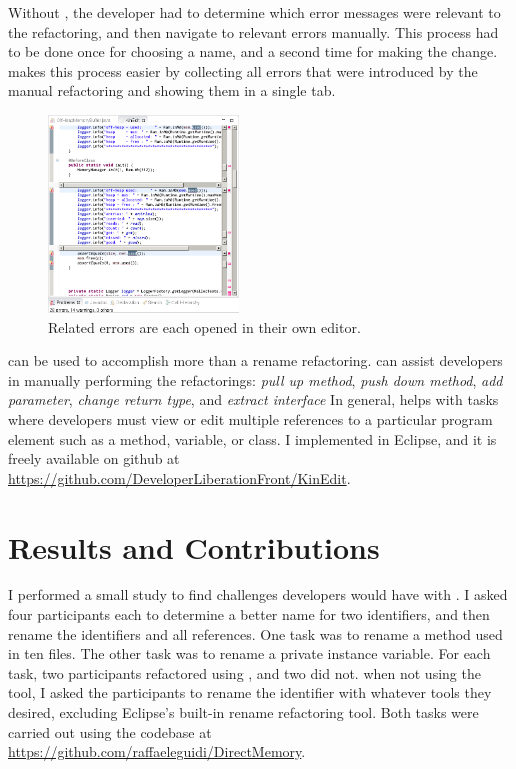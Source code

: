 \documentclass{sigplanconf}
\begin{document}
Without \pname{}, the developer had to determine which error messages were
relevant to the refactoring, and then navigate to relevant errors manually. This
process had to be done once for choosing a name, and a second time for making
the change. \pname{} makes this process easier by collecting all errors that
were introduced by the manual refactoring and showing them in a single tab.

\begin{figure}[h]
\begin{center}
\includegraphics[width=0.45\textwidth]{multiple-editors.png}
\caption{Related errors are each opened in their own editor.\label{mult}}
\end{center}
\end{figure}

\pname{} can be used to accomplish more than a rename refactoring.
\pname{} can assist developers in manually performing the refactorings:
\textit{pull up method}, \textit{push down method}, \textit{add parameter},
\textit{change return type}, and \textit{extract interface}
In general,
\pname{} helps with tasks where developers must view or edit multiple
references to a particular program element such as a method, variable, or
class.
I implemented \pname{} in Eclipse, and it is freely available on
github at \url{https://github.com/DeveloperLiberationFront/KinEdit}.

\section{Results and Contributions}
I performed a small study to find challenges developers would have with
\pname{}. I asked four participants each to determine a better
name for two identifiers, and then rename the identifiers and all references.
One task was to rename a method used in ten files.
The other task was to rename a private instance variable.
For each task, two participants refactored using \pname{}, and two did not.
when not using the tool, I asked the participants to rename the
identifier with whatever tools they desired, excluding Eclipse's built-in rename
refactoring tool. Both tasks were carried out using the codebase at
\url{https://github.com/raffaeleguidi/DirectMemory}.
\end{document}
